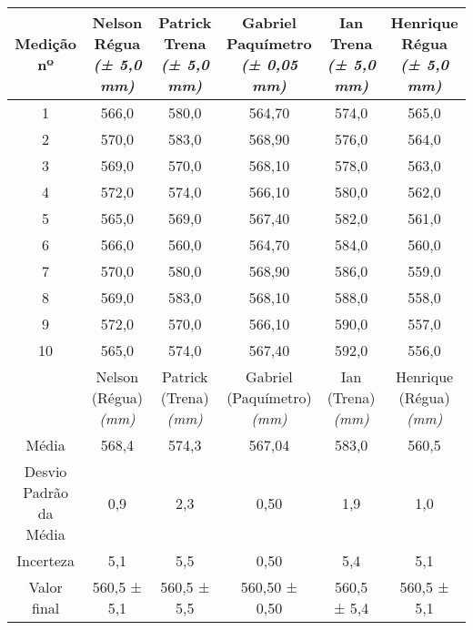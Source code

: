 \documentclass{article}
\begin{document}
\begin{table}[h!]
\centering
\begin{tabular}{c c c c c c }
\toprule
Medição nº & \shortstack{Nelson\\Régua\\\textit{(± 5,0 mm)}} & \shortstack{Patrick\\Trena\\\textit{(± 5,0 mm)}} & \shortstack{Gabriel\\Paquímetro\\\textit{(± 0,05 mm)}} & \shortstack{Ian\\Trena\\\textit{(± 5,0 mm)}} & \shortstack{Henrique\\Régua\\\textit{(± 5,0 mm)}}\\
\midrule
1 & 566,0 & 580,0 & 564,70 & 574,0 & 565,0\\
2 & 570,0 & 583,0 & 568,90 & 576,0 & 564,0\\
3 & 569,0 & 570,0 & 568,10 & 578,0 & 563,0\\
4 & 572,0 & 574,0 & 566,10 & 580,0 & 562,0\\
5 & 565,0 & 569,0 & 567,40 & 582,0 & 561,0\\
6 & 566,0 & 560,0 & 564,70 & 584,0 & 560,0\\
7 & 570,0 & 580,0 & 568,90 & 586,0 & 559,0\\
8 & 569,0 & 583,0 & 568,10 & 588,0 & 558,0\\
9 & 572,0 & 570,0 & 566,10 & 590,0 & 557,0\\
10 & 565,0 & 574,0 & 567,40 & 592,0 & 556,0\\
\midrule
&\shortstack{Nelson\\(Régua)\\\textit{(mm)}} & \shortstack{Patrick\\(Trena)\\\textit{(mm)}} & \shortstack{Gabriel\\(Paquímetro)\\\textit{(mm)}} & \shortstack{Ian\\(Trena)\\\textit{(mm)}} & \shortstack{Henrique\\(Régua)\\\textit{(mm)}}\\
\midrule
Média & 568,4 & 574,3 & 567,04 & 583,0 & 560,5\\[3pt]
\shortstack{Desvio\\Padrão da\\Média} & 0,9 & 2,3 & 0,50 & 1,9 & 1,0\\[3pt]
Incerteza & 5,1 & 5,5 & 0,50 & 5,4 & 5,1\\[3pt]
Valor final & 560,5 ± 5,1 & 560,5 ± 5,5 & 560,50 ± 0,50 & 560,5 ± 5,4 & 560,5 ± 5,1\\[3pt]
\bottomrule
\end{tabular}
\end{table}
\end{document}
